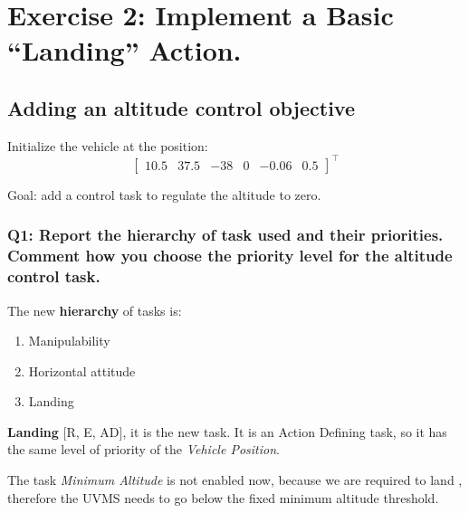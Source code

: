 \documentclass{article}
\begin{document}
\clearpage

\section{Exercise 2: Implement a Basic “Landing” Action.}
\subsection{Adding an altitude control objective}
Initialize the vehicle at the position:
\begin{displaymath}
\begin{bmatrix} 10.5 & 37.5 & -38 & 0 & -0.06 & 0.5 \end{bmatrix}^\top
\end{displaymath} 

Goal: add a control task to regulate the altitude to zero.

\subsubsection{Q1: Report the hierarchy of task used and their priorities. Comment how you choose the priority level for the altitude control task.}

\noindent
\vspace{5px}
The new \textbf{hierarchy} of tasks is:
\begin{enumerate}
	\item Manipulability
	\item Horizontal attitude
	\item Landing
\end{enumerate}

\noindent
\vspace{2px}
\begin{description}
\item \textbf{Landing} [R, E, AD], it is the new task. It is an Action Defining task, so it has the same level of priority of the \textit{Vehicle Position}.
\end{description}

\noindent
The task \textit{Minimum Altitude} is not enabled now, because we are required to land , therefore the UVMS needs to go below the fixed minimum altitude threshold.
\end{document}
